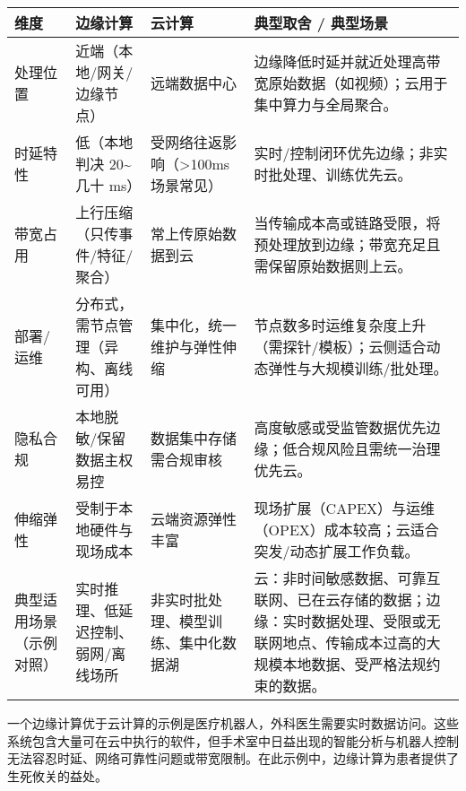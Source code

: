 \begin{longtable}[]{@{}
  >{\raggedright\arraybackslash}p{}
  >{\raggedright\arraybackslash}p{}
  >{\raggedright\arraybackslash}p{}
  >{\raggedright\arraybackslash}p{}@{}}
\toprule\noalign{}
\begin{minipage}[b]{\linewidth}\raggedright
维度
\end{minipage} & \begin{minipage}[b]{\linewidth}\raggedright
边缘计算
\end{minipage} & \begin{minipage}[b]{\linewidth}\raggedright
云计算
\end{minipage} & \begin{minipage}[b]{\linewidth}\raggedright
典型取舍 / 典型场景
\end{minipage} \\
\midrule\noalign{}
\endhead
\bottomrule\noalign{}
\endlastfoot
处理位置 & 近端（本地/网关/边缘节点） & 远端数据中心 &
边缘降低时延并就近处理高带宽原始数据（如视频）；云用于集中算力与全局聚合。 \\
时延特性 & 低（本地判决 20\textasciitilde 几十 ms） &
受网络往返影响（\textgreater100ms 场景常见） &
实时/控制闭环优先边缘；非实时批处理、训练优先云。 \\
带宽占用 & 上行压缩（只传事件/特征/聚合） & 常上传原始数据到云 &
当传输成本高或链路受限，将预处理放到边缘；带宽充足且需保留原始数据则上云。 \\
部署/运维 & 分布式，需节点管理（异构、离线可用） &
集中化，统一维护与弹性伸缩 &
节点数多时运维复杂度上升（需探针/模板）；云侧适合动态弹性与大规模训练/批处理。 \\
隐私合规 & 本地脱敏/保留数据主权易控 & 数据集中存储需合规审核 &
高度敏感或受监管数据优先边缘；低合规风险且需统一治理优先云。 \\
伸缩弹性 & 受制于本地硬件与现场成本 & 云端资源弹性丰富 &
现场扩展（CAPEX）与运维（OPEX）成本较高；云适合突发/动态扩展工作负载。 \\
典型适用场景（示例对照） & 实时推理、低延迟控制、弱网/离线场所 &
非实时批处理、模型训练、集中化数据湖 &
云：非时间敏感数据、可靠互联网、已在云存储的数据；边缘：实时数据处理、受限或无联网地点、传输成本过高的大规模本地数据、受严格法规约束的数据。 \\
\end{longtable}

一个边缘计算优于云计算的示例是医疗机器人，外科医生需要实时数据访问。这些系统包含大量可在云中执行的软件，但手术室中日益出现的智能分析与机器人控制无法容忍时延、网络可靠性问题或带宽限制。在此示例中，边缘计算为患者提供了生死攸关的益处。

